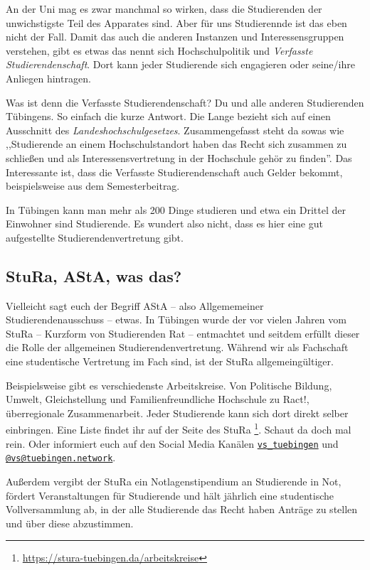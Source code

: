 An der Uni mag es zwar manchmal so wirken, dass die Studierenden der unwichstigste
Teil des Apparates sind.
Aber für uns Studierennde ist das eben nicht der Fall.
Damit das auch die anderen Instanzen und Interessensgruppen verstehen, gibt es
etwas das nennt sich Hochschulpolitik und \textit{Verfasste
Studierendenschaft}. Dort kann jeder Studierende sich engagieren oder seine/ihre
Anliegen hintragen.

Was ist denn die Verfasste Studierendenschaft? Du und alle anderen Studierenden
Tübingens. So einfach die kurze Antwort. Die Lange bezieht sich auf einen
Ausschnitt des \textit{Landeshochschulgesetzes}.  Zusammengefasst steht da
sowas wie ,,Studierende an einem Hochschulstandort haben das Recht sich zusammen
zu schließen und als Interessensvertretung in der Hochschule gehör zu finden''.
Das Interessante ist, dass die Verfasste Studierendenschaft auch Gelder bekommt,
beispielsweise aus dem Semesterbeitrag.

In Tübingen kann man mehr als 200 Dinge studieren und etwa ein Drittel der
Einwohner sind Studierende. Es wundert also nicht, dass es hier eine
gut aufgestellte Studierendenvertretung gibt.


\subsection{StuRa, AStA, was das?}

Vielleicht sagt euch der Begriff AStA -- also Allgememeiner
Studierendenausschuss -- etwas. In Tübingen wurde der vor vielen Jahren vom
StuRa -- Kurzform von Studierenden Rat -- entmachtet und seitdem erfüllt dieser
die Rolle der allgemeinen Studierendenvertretung. Während wir als Fachschaft
eine studentische Vertretung im Fach sind, ist der StuRa allgemeingültiger.

Beispielsweise gibt es verschiedenste Arbeitskreise. Von Politische Bildung,
Umwelt, Gleichstellung und Familienfreundliche Hochschule zu Ract!, überregionale
Zusammenarbeit. Jeder Studierende kann sich dort direkt selber einbringen.
Eine Liste findet ihr auf der Seite des StuRa
\footnote{\url{https://stura-tuebingen.da/arbeitskreise}}. Schaut da doch mal
rein. Oder informiert euch auf den Social Media Kanälen 
\href{https://www.instagram.com/vs\_tuebingen}{\texttt{vs\_tuebingen}}
und \href{https://toot.kif.rocks/@vs@tuebingen.network}{\texttt{@vs@tuebingen.network}}.

Außerdem vergibt der StuRa ein Notlagenstipendium an Studierende in Not, fördert
Veranstaltungen für Studierende und hält jährlich eine studentische Vollversammlung
ab, in der alle Studierende das Recht haben Anträge zu stellen und über diese abzustimmen.

